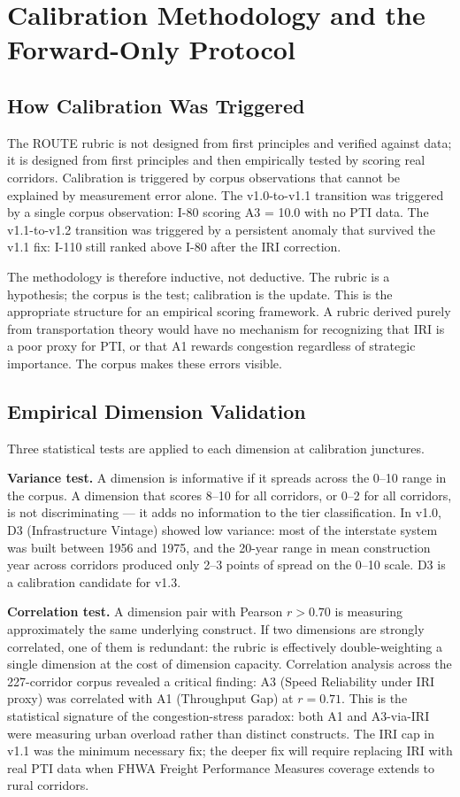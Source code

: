 \section{Calibration Methodology and the Forward-Only Protocol}
\label{sec:calibration-method}

\subsection{How Calibration Was Triggered}

The ROUTE rubric is not designed from first principles and verified against data; it is designed from first principles and then empirically tested by scoring real corridors. Calibration is triggered by corpus observations that cannot be explained by measurement error alone. The v1.0-to-v1.1 transition was triggered by a single corpus observation: I-80 scoring A3 = 10.0 with no PTI data. The v1.1-to-v1.2 transition was triggered by a persistent anomaly that survived the v1.1 fix: I-110 still ranked above I-80 after the IRI correction.

The methodology is therefore inductive, not deductive. The rubric is a hypothesis; the corpus is the test; calibration is the update. This is the appropriate structure for an empirical scoring framework. A rubric derived purely from transportation theory would have no mechanism for recognizing that IRI is a poor proxy for PTI, or that A1 rewards congestion regardless of strategic importance. The corpus makes these errors visible.

\subsection{Empirical Dimension Validation}

Three statistical tests are applied to each dimension at calibration junctures.

\textbf{Variance test.} A dimension is informative if it spreads across the 0--10 range in the corpus. A dimension that scores 8--10 for all corridors, or 0--2 for all corridors, is not discriminating --- it adds no information to the tier classification. In v1.0, D3 (Infrastructure Vintage) showed low variance: most of the interstate system was built between 1956 and 1975, and the 20-year range in mean construction year across corridors produced only 2--3 points of spread on the 0--10 scale. D3 is a calibration candidate for v1.3.

\textbf{Correlation test.} A dimension pair with Pearson $r > 0.70$ is measuring approximately the same underlying construct. If two dimensions are strongly correlated, one of them is redundant: the rubric is effectively double-weighting a single dimension at the cost of dimension capacity. Correlation analysis across the 227-corridor corpus revealed a critical finding: A3 (Speed Reliability under IRI proxy) was correlated with A1 (Throughput Gap) at $r = 0.71$. This is the statistical signature of the congestion-stress paradox: both A1 and A3-via-IRI were measuring urban overload rather than distinct constructs. The IRI cap in v1.1 was the minimum necessary fix; the deeper fix will require replacing IRI with real PTI data when FHWA Freight Performance Measures coverage extends to rural corridors.

